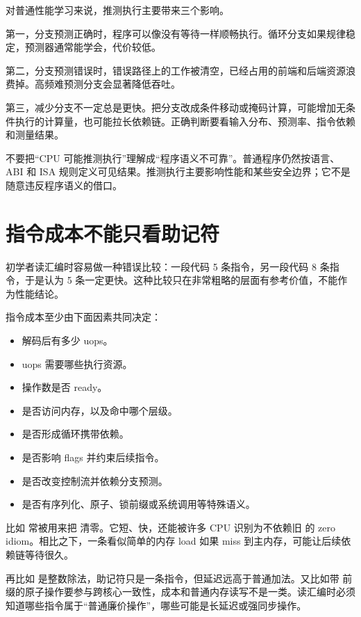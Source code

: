 对普通性能学习来说，推测执行主要带来三个影响。

第一，分支预测正确时，程序可以像没有等待一样顺畅执行。循环分支如果规律稳定，预测器通常能学会，代价较低。

第二，分支预测错误时，错误路径上的工作被清空，已经占用的前端和后端资源浪费掉。高频难预测分支会显著降低吞吐。

第三，减少分支不一定总是更快。把分支改成条件移动或掩码计算，可能增加无条件执行的计算量，也可能拉长依赖链。正确判断要看输入分布、预测率、指令依赖和测量结果。

\begin{warningbox}
不要把“CPU 可能推测执行”理解成“程序语义不可靠”。普通程序仍然按语言、ABI 和 ISA 规则定义可见结果。推测执行主要影响性能和某些安全边界；它不是随意违反程序语义的借口。
\end{warningbox}

\section{指令成本不能只看助记符}

初学者读汇编时容易做一种错误比较：一段代码 5 条指令，另一段代码 8 条指令，于是认为 5 条一定更快。这种比较只在非常粗略的层面有参考价值，不能作为性能结论。

指令成本至少由下面因素共同决定：

\begin{itemize}
  \item 解码后有多少 uops。
  \item uops 需要哪些执行资源。
  \item 操作数是否 ready。
  \item 是否访问内存，以及命中哪个层级。
  \item 是否形成循环携带依赖。
  \item 是否影响 flags 并约束后续指令。
  \item 是否改变控制流并依赖分支预测。
  \item 是否有序列化、原子、锁前缀或系统调用等特殊语义。
\end{itemize}

比如  常被用来把  清零。它短、快，还能被许多 CPU 识别为不依赖旧  的 zero idiom。相比之下，一条看似简单的内存 load 如果 miss 到主内存，可能让后续依赖链等待很久。

再比如  是整数除法，助记符只是一条指令，但延迟远高于普通加法。又比如带  前缀的原子操作要参与跨核心一致性，成本和普通内存读写不是一类。读汇编时必须知道哪些指令属于“普通廉价操作”，哪些可能是长延迟或强同步操作。

